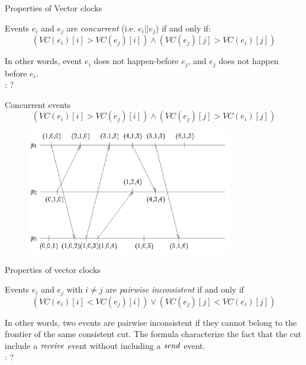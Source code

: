 \begin{frame}{Properties of Vector clocks}
	
\begin{definition}
Events $e_i$ and $e_j$ are {\em concurrent} (i.e. $e_i || e_j$) if and only if:
\[
   (VC(e_i)[i] > VC(e_j)[i]) \wedge (VC(e_j)[j] > VC(e_i)[j])
\]
\end{definition}

\bigskip
In other words, event $e_i$ does not happen-before $e_j$, and $e_j$ does not happen before
$e_i$.\\

\bigskip
{}: ?

\end{frame}

\begin{frame}{Concurrent events}
\[
   (VC(e_i)[i] > VC(e_j)[i]) \wedge (VC(e_j)[j] > VC(e_i)[j])
\]

\begin{figure} 
\includegraphics[width=9cm]{figs/02/figure-7}
\end{figure}


\end{frame}

\begin{frame}{Properties of vector clocks}
	
\begin{definition}
Events $e_i$ and $e_j$ with $i \neq j$ are {\em pairwise inconsistent} if and only if
\[
   (VC(e_i)[i] < VC(e_j)[i]) \vee (VC(e_j)[j] < VC(e_i)[j])
\]
\end{definition}

\bigskip
In other words,  two events are pairwise inconsistent if they cannot belong to the frontier
of the same consistent cut. The formula characterize the fact that the cut include
a $\mathit{receive}$ event without including a $\mathit{send}$ event.\\

\bigskip
{}: ?



\end{frame}


